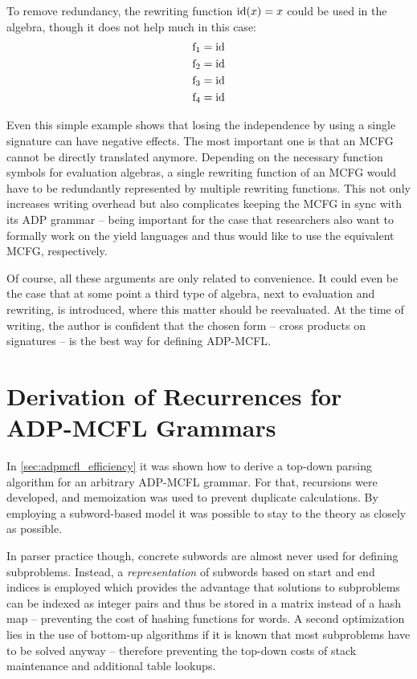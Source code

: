 \documentclass[
    a4paper,
    12pt,
    twoside,
    BCOR=12mm,
    parskip=half,
    chapterprefix,
    numbers=noenddot,
    bibliography=totoc
]{scrbook}
\begin{document}
To remove redundancy, the rewriting function $\mathrm{id}(x)=x$ could be used in the algebra, though it does not help much in this case:
\begin{align*}
	\mathrm{f}_1&=\mathrm{id}\\
	\mathrm{f}_2&=\mathrm{id}\\
	\mathrm{f}_3&=\mathrm{id}\\
	\mathrm{f}_4&=\mathrm{id}
\end{align*}

Even this simple example shows that losing the independence by using a single signature can have  negative effects. The most important one is that an MCFG cannot be directly translated anymore. Depending on the necessary function symbols for evaluation algebras, a single rewriting function of an MCFG would have to be redundantly represented by multiple rewriting functions. This not only increases writing overhead but also complicates keeping the MCFG in sync with its ADP grammar -- being important for the case that researchers also want to formally work on the yield languages and thus would like to use the equivalent MCFG, respectively.

Of course, all these arguments are only related to convenience. It could even be the case that at some point a third type of algebra, next to evaluation and rewriting, is introduced, where this matter should be reevaluated. At the time of writing, the author is confident that the chosen form -- cross products on signatures -- is the best way for defining \gls{ADP-MCFL}.

\chapter{Derivation of Recurrences for ADP-MCFL Grammars}
\label{apx:derivation}

In \cref{sec:adpmcfl_efficiency} it was shown how to derive a top-down parsing algorithm for an arbitrary ADP-MCFL grammar. For that, recursions were developed, and memoization was used to prevent duplicate calculations. By employing a subword-based model it was possible to stay to the theory as closely as possible.

In parser practice though, concrete subwords are almost never used for defining subproblems. Instead, a \emph{representation} of subwords based on start and end indices is employed which provides the advantage that solutions to subproblems can be indexed as integer pairs and thus be stored in a matrix instead of a hash map -- preventing the cost of hashing functions for words. A second optimization lies in the use of bottom-up algorithms if it is known that most subproblems have to be solved anyway -- therefore preventing the top-down costs of stack maintenance and additional table lookups.
\end{document}
